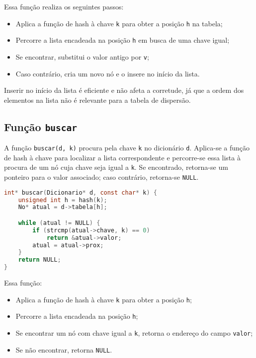 Essa função realiza os seguintes passos:

\begin{itemize}
  \item Aplica a função de hash à chave \texttt{k} para obter a posição \texttt{h} na tabela;
  \item Percorre a lista encadeada na posição \texttt{h} em busca de uma chave igual;
  \item Se encontrar, substitui o valor antigo por \texttt{v};
  \item Caso contrário, cria um novo nó e o insere no início da lista.
\end{itemize}

Inserir no início da lista é eficiente e não afeta a corretude, já que a ordem dos elementos na lista não é relevante para a tabela de dispersão.

\subsection*{Função \texttt{buscar}}

A função \texttt{buscar(d, k)} procura pela chave \texttt{k} no dicionário \texttt{d}. 
Aplica-se a função de hash à chave para localizar a lista correspondente e percorre-se essa lista à procura de um nó cuja chave seja igual a \texttt{k}. 
Se encontrado, retorna-se um ponteiro para o valor associado; caso contrário, retorna-se \texttt{NULL}.

\begin{lstlisting}[language=C, caption={Busca de uma chave na tabela}]
int* buscar(Dicionario* d, const char* k) {
    unsigned int h = hash(k);
    No* atual = d->tabela[h];

    while (atual != NULL) {
        if (strcmp(atual->chave, k) == 0)
            return &atual->valor;
        atual = atual->prox;
    }
    return NULL;
}
\end{lstlisting}

Essa função:

\begin{itemize}
  \item Aplica a função de hash à chave \texttt{k} para obter a posição \texttt{h};
  \item Percorre a lista encadeada na posição \texttt{h};
  \item Se encontrar um nó com chave igual a \texttt{k}, retorna o endereço do campo \texttt{valor};
  \item Se não encontrar, retorna \texttt{NULL}.
\end{itemize}

